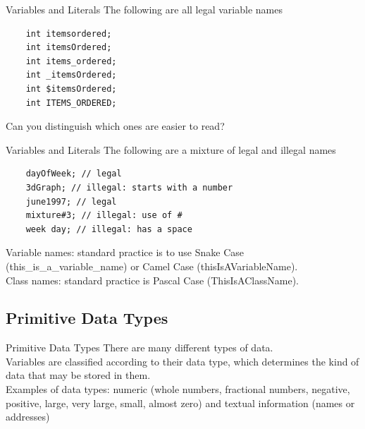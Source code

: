\documentclass[11pt]{beamer}
\begin{document}
\begin{frame}[fragile]{Variables and Literals}
    The following are all legal variable names
    \begin{lstlisting}
    int itemsordered;
    int itemsOrdered;
    int items_ordered;
    int _itemsOrdered;
    int $itemsOrdered;
    int ITEMS_ORDERED;
    \end{lstlisting}
    Can you distinguish which ones are easier to read?
\end{frame}

\begin{frame}[fragile]{Variables and Literals}
    The following are a mixture of legal and illegal names
    \begin{lstlisting}
    dayOfWeek; // legal
    3dGraph; // illegal: starts with a number
    june1997; // legal
    mixture#3; // illegal: use of #
    week day; // illegal: has a space
    \end{lstlisting}
    Variable names: standard practice is to use Snake Case (this\_is\_a\_variable\_name) or Camel Case (thisIsAVariableName). \\ \vspace{1em}
    Class names: standard practice is Pascal Case (ThisIsAClassName).
\end{frame}

\subsection{Primitive Data Types}
\begin{frame}[fragile]{Primitive Data Types}
    There are many different types of data. \\ \vspace{1em}
    Variables are classified according to their data type, which determines the kind of data that may be stored in them. \\ \vspace{1em}
    Examples of data types: numeric (whole numbers, fractional numbers, negative, positive, large, very large, small, almost zero) and textual information (names or addresses)
\end{frame}
\end{document}
